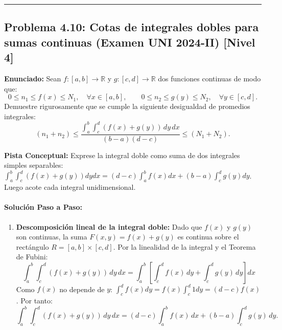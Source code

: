 \documentclass[11pt,a4paper]{article}
\begin{document}
\vspace{0.5cm}
\hrule
\vspace{0.5cm}

\subsection*{Problema 4.10: Cotas de integrales dobles para sumas continuas (Examen UNI 2024-II) \hfill \color{primaryblue}\small[Nivel 4]}

\begin{tcolorbox}[colback=white,colframe=gray!40,arc=1mm,boxrule=0.5pt,left=3mm,right=3mm,top=2mm,bottom=2mm]
\textbf{Enunciado:} Sean $f: [a,b] \to \mathbb{R}$ y $g: [c,d] \to \mathbb{R}$ dos funciones continuas de modo que:
\begin{equation*}
0 \le n_1 \le f(x) \le N_1, \quad \forall x \in [a,b], \qquad 0 \le n_2 \le g(y) \le N_2, \quad \forall y \in [c,d].
\end{equation*}
Demuestre rigurosamente que se cumple la siguiente desigualdad de promedios integrales:
\begin{equation*}
(n_1 + n_2) \le \frac{\int_a^b \int_c^d (f(x) + g(y)) \, dy \, dx}{(b - a)(d - c)} \le (N_1 + N_2).
\end{equation*}
\end{tcolorbox}

\begin{tcolorbox}[colback=yellow!4,colframe=accentamber!70,arc=1mm,boxrule=0.5pt,left=3mm,right=3mm,top=1.5mm,bottom=1.5mm]
\textbf{Pista Conceptual:} Exprese la integral doble como suma de dos integrales simples separables: $\int_a^b \int_c^d (f(x)+g(y)) dy dx = (d-c)\int_a^b f(x)dx + (b-a)\int_c^d g(y)dy$. Luego acote cada integral unidimensional.
\end{tcolorbox}

\paragraph{Solución Paso a Paso:}\par
\begin{enumerate}[label=\textbf{\arabic*.}]
\item \textbf{Descomposición lineal de la integral doble:}
Dado que $f(x)$ y $g(y)$ son continuas, la suma $F(x,y) = f(x) + g(y)$ es continua sobre el rectángulo $R = [a,b] \times [c,d]$.
Por la linealidad de la integral y el Teorema de Fubini:
\begin{equation*}
\int_a^b \int_c^d (f(x) + g(y)) \, dy \, dx = \int_a^b \left[ \int_c^d f(x) \, dy + \int_c^d g(y) \, dy \right] dx
\end{equation*}
Como $f(x)$ no depende de $y$: $\int_c^d f(x) dy = f(x) \int_c^d 1 dy = (d - c) f(x)$.
Por tanto:
\begin{equation*}
\int_a^b \int_c^d (f(x) + g(y)) \, dy \, dx = (d - c) \int_a^b f(x) \, dx + (b - a) \int_c^d g(y) \, dy.
\end{equation*}
\end{enumerate}
\end{document}
